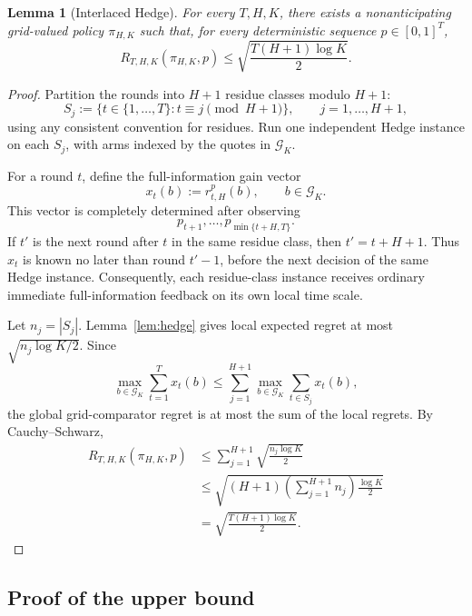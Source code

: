 \documentclass[11pt]{article}
\newtheorem{lemma}[theorem]{Lemma}
\theoremstyle{remark}
\newcommand{\G}{\mathcal{G}}
\begin{document}
\begin{lemma}[Interlaced Hedge]\label{lem:interlaced}
For every $T,H,K$, there exists a nonanticipating grid-valued policy $\pi_{H,K}$
such that, for every deterministic sequence $p\in[0,1]^T$,
\begin{equation}\label{eq:interlaced}
    R_{T,H,K}(\pi_{H,K},p)
    \le
    \sqrt{\frac{T(H+1)\log K}{2}}.
\end{equation}
\end{lemma}

\begin{proof}
Partition the rounds into $H+1$ residue classes modulo $H+1$:
\[
    S_j
    :=
    \{t\in\{1,\ldots,T\}:t\equiv j\pmod{H+1}\},
    \qquad j=1,\ldots,H+1,
\]
using any consistent convention for residues.  Run one independent Hedge
instance on each $S_j$, with arms indexed by the quotes in $\G_K$.

For a round $t$, define the full-information gain vector
\[
    x_t(b):=r_{t,H}^p(b),\qquad b\in\G_K.
\]
This vector is completely determined after observing
\[
    p_{t+1},\ldots,p_{\min\{t+H,T\}}.
\]
If $t'$ is the next round after $t$ in the same residue class, then
$t'=t+H+1$.  Thus $x_t$ is known no later than round $t'-1$, before the next
decision of the same Hedge instance.  Consequently, each residue-class
instance receives ordinary immediate full-information feedback on its own local
time scale.

Let $n_j=|S_j|$.  Lemma~\ref{lem:hedge} gives local expected regret at most
$\sqrt{n_j\log K/2}$.  Since
\[
    \max_{b\in\G_K}\sum_{t=1}^T x_t(b)
    \le
    \sum_{j=1}^{H+1}
    \max_{b\in\G_K}\sum_{t\in S_j}x_t(b),
\]
the global grid-comparator regret is at most the sum of the local regrets.
By Cauchy--Schwarz,
\begin{align*}
    R_{T,H,K}(\pi_{H,K},p)
    &\le
    \sum_{j=1}^{H+1}\sqrt{\frac{n_j\log K}{2}}\\
    &\le
    \sqrt{(H+1)\left(\sum_{j=1}^{H+1}n_j\right)\frac{\log K}{2}}\\
    &=
    \sqrt{\frac{T(H+1)\log K}{2}}.
\end{align*}
\end{proof}

\subsection{Proof of the upper bound}
\end{document}
